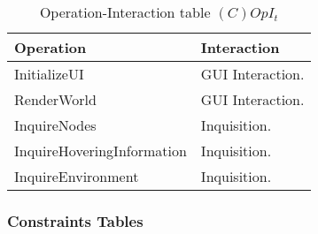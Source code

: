 \begin{table}[H]
	\centering
	\begin{tabular}{|p{5cm}|p{7cm}|}
			\hline
			\textbf{Operation} & \textbf{Interaction} \\
			\hline
			InitializeUI & GUI Interaction. \\
			\hline
			RenderWorld & GUI Interaction. \\
			\hline
			InquireNodes & Inquisition. \\
			\hline
			InquireHoveringInformation & Inquisition. \\
			\hline
			InquireEnvironment & Inquisition. \\
			\hline
		\end{tabular}
	\caption{Operation-Interaction table $(C)OpI_t$}
	\label{tab:opit}
\end{table}

\subsubsection{Constraints Tables}


